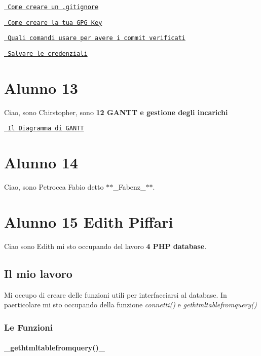 \href{https://gist.github.com/simonemastella/e69cd0a0d9fe151e52c0fc53ac4ad3ea}{\texttt{ Come creare un .gitignore}}

\href{https://gist.github.com/simonemastella/2ad4f08ed6f18af7e102a8e1a573dd8d}{\texttt{ Come creare la tua G\+PG Key}}

\href{https://gist.github.com/simonemastella/3e763531b32e1db583e2dcb4fdd668a8}{\texttt{ Quali comandi usare per avere i commit verificati}}

\href{https://gist.github.com/simonemastella/ecd089c6106a961eb9272a40c5b16d5a}{\texttt{ Salvare le credenziali}} \section*{Alunno 13}

Ciao, sono Chirstopher, sono {\bfseries{12 G\+A\+N\+TT e gestione degli incarichi}}
\begin{DoxyItemize}
\item \href{http://htmlpreview.github.io/?https://github.com/simonemastella/5BIT/blob/master/documenti/diagramma_di_gantt.html}{\texttt{ Il Diagramma di G\+A\+N\+TT}} \section*{Alunno 14}
\end{DoxyItemize}

Ciao, sono Petrocca Fabio detto $\ast$$\ast$\+\_\+\+Fabenz\+\_\+$\ast$$\ast$. \section*{Alunno 15 Edith Piffari}

Ciao sono Edith mi sto occupando del lavoro {\bfseries{4 P\+HP database}}. \subsection*{Il mio lavoro}

Mi occupo di creare delle funzioni utili per interfacciarsi al database. In paerticolare mi sto occupando della funzione {\itshape connetti()} e {\itshape gethtmltablefromquery()} \subsubsection*{Le Funzioni}

\paragraph*{\+\_\+gethtmltablefromquery()\+\_\+}

